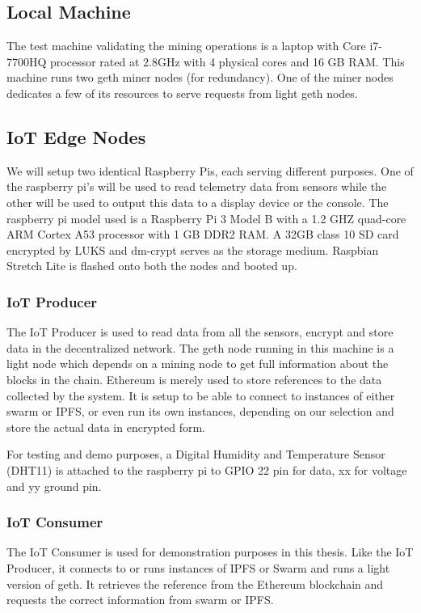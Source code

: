\documentclass[11pt,openright]{report}
\begin{document}
\subsection{Local Machine}
The test machine validating the mining operations is a laptop with Core i7-7700HQ processor rated at 2.8GHz with 4 physical cores and 16 GB RAM. This machine runs two geth miner nodes (for redundancy). One of the miner nodes dedicates a few of its resources to serve requests from light geth nodes.

\subsection{IoT Edge Nodes}
We will setup two identical Raspberry Pis, each serving different purposes. One of the raspberry pi's will be used to read telemetry data from sensors while the other will be used to output this data to a display device or the console.
The raspberry pi model used is a Raspberry Pi 3 Model B with a 1.2 GHZ quad-core ARM Cortex A53 processor with 1 GB DDR2 RAM. A 32GB class 10 SD card encrypted by LUKS and dm-crypt serves as the storage medium. Raspbian Stretch Lite is flashed onto both the nodes and booted up.

\subsubsection{IoT Producer}
The IoT Producer is used to read data from all the sensors, encrypt and store data in the decentralized network. The geth node running in this machine is a light node which depends on a mining node to get full information about the blocks in the chain. Ethereum is merely used to store references to the data collected by the system. It is setup to be able to connect to instances of either swarm or IPFS, or even run its own instances, depending on our selection and store the actual data in encrypted form.

For testing and demo purposes, a Digital Humidity and Temperature Sensor (DHT11) is attached to the raspberry pi to GPIO 22 pin for data, xx for voltage and yy ground pin.

\subsubsection{IoT Consumer}
The IoT Consumer is used for demonstration purposes in this thesis. Like the IoT Producer, it connects to or runs instances of IPFS or Swarm and runs a light version of geth. It retrieves the reference from the Ethereum blockchain and requests the correct information from swarm or IPFS.
\end{document}
